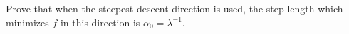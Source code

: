 Prove that when the steepest-descent direction is used, the step length which minimizes $f$ in this direction is 
$\alpha_0 = \lambda^{-1}$.

\begin{solution}
    \ \\
    \vfill
\end{solution}